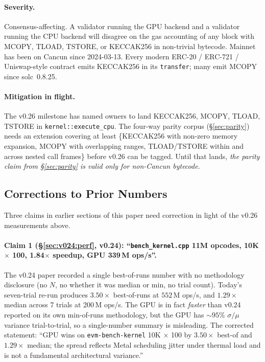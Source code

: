 \paragraph{Severity.} Consensus-affecting. A validator running the
GPU backend and a validator running the CPU backend will disagree on
the gas accounting of any block with MCOPY, TLOAD, TSTORE, or
KECCAK256 in non-trivial bytecode. Mainnet has been on Cancun since
2024-03-13. Every modern ERC-20 / ERC-721 / Uniswap-style contract
emits KECCAK256 in its \texttt{transfer}; many emit MCOPY since
solc~0.8.25.

\paragraph{Mitigation in flight.} The v0.26 milestone has named owners
to land KECCAK256, MCOPY, TLOAD, TSTORE in
\texttt{kernel::execute\_cpu}. The four-way parity corpus
(\S\ref{sec:parity}) needs an extension covering at least
\{KECCAK256 with non-zero memory expansion, MCOPY with overlapping
ranges, TLOAD/TSTORE within and across nested call frames\} before
v0.26 can be tagged. Until that lands, \emph{the parity claim from
\S\ref{sec:parity} is valid only for non-Cancun bytecode}.

\subsection{Corrections to Prior Numbers}
\label{sec:v026:corrections}

Three claims in earlier sections of this paper need correction in
light of the v0.26 measurements above.

\paragraph{Claim 1 (\S\ref{sec:v024:perf}, v0.24): ``\texttt{bench\_kernel.cpp}
11M opcodes, 10K $\times$ 100, 1.84$\times$ speedup, GPU 339\,M
ops/s''.}

The v0.24 paper recorded a single best-of-runs number with no
methodology disclosure (no $N$, no whether it was median or min, no
trial count). Today's seven-trial re-run produces $3.50\times$
best-of-runs at $552\,$M ops/s, and $1.29\times$ median across 7
trials at 200\,M ops/s. The GPU is in fact \emph{faster} than v0.24
reported on its own min-of-runs methodology, but the GPU has $\sim 95\%$
$\sigma/\mu$ variance trial-to-trial, so a single-number summary is
misleading. The corrected statement: ``GPU wins on
\texttt{evm-bench-kernel} 10K $\times$ 100 by $3.50\times$ best-of and
$1.29\times$ median; the spread reflects Metal scheduling jitter under
thermal load and is not a fundamental architectural variance.''

